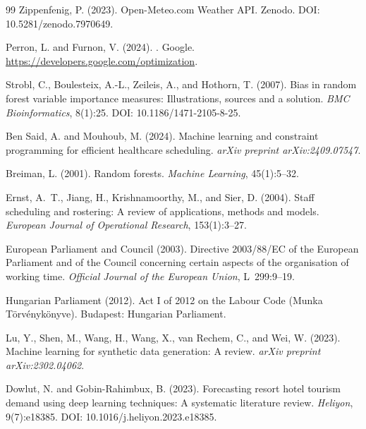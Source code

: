 \documentclass[12pt,a4paper,oneside]{article}
\begin{document}
\begin{thebibliography}{99}
Zippenfenig, P. (2023).
\newblock Open-Meteo.com Weather API.
\newblock Zenodo.
\newblock DOI: 10.5281/zenodo.7970649.

Perron, L. and Furnon, V. (2024).
.
\newblock Google. \url{https://developers.google.com/optimization}.

Strobl, C., Boulesteix, A.-L., Zeileis, A., and Hothorn, T. (2007).
\newblock Bias in random forest variable importance measures: Illustrations, sources and a solution.
\newblock \textit{BMC Bioinformatics}, 8(1):25.
\newblock DOI: 10.1186/1471-2105-8-25.

Ben Said, A. and Mouhoub, M. (2024).
\newblock Machine learning and constraint programming for efficient healthcare scheduling.
\newblock \textit{arXiv preprint arXiv:2409.07547}.

Breiman, L. (2001).
\newblock Random forests.
\newblock \textit{Machine Learning}, 45(1):5--32.

Ernst, A.~T., Jiang, H., Krishnamoorthy, M., and Sier, D. (2004).
\newblock Staff scheduling and rostering: A review of applications, methods and models.
\newblock \textit{European Journal of Operational Research}, 153(1):3--27.

European Parliament and Council (2003).
\newblock Directive 2003/88/{EC} of the European Parliament and of the Council concerning certain aspects of the organisation of working time.
\newblock \textit{Official Journal of the European Union}, L~299:9--19.

Hungarian Parliament (2012).
\newblock Act {I} of 2012 on the Labour Code (Munka T\"{o}rv\'{e}nyk\"{o}nyve).
\newblock Budapest: Hungarian Parliament.

Lu, Y., Shen, M., Wang, H., Wang, X., van Rechem, C., and Wei, W. (2023).
\newblock Machine learning for synthetic data generation: A review.
\newblock \textit{arXiv preprint arXiv:2302.04062}.

Dowlut, N. and Gobin-Rahimbux, B. (2023).
\newblock Forecasting resort hotel tourism demand using deep learning
  techniques: A systematic literature review.
\newblock \textit{Heliyon}, 9(7):e18385.
\newblock DOI: 10.1016/j.heliyon.2023.e18385.


\end{thebibliography}
\end{document}
